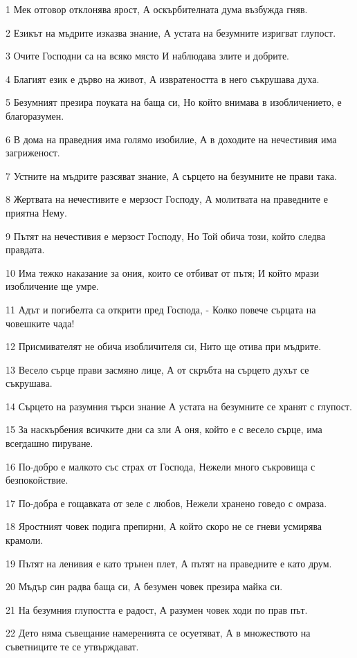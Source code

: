 \par 1 Мек отговор отклонява ярост, А оскърбителната дума възбужда гняв.
\par 2 Езикът на мъдрите изказва знание, А устата на безумните изригват глупост.
\par 3 Очите Господни са на всяко място И наблюдава злите и добрите.
\par 4 Благият език е дърво на живот, А извратеността в него съкрушава духа.
\par 5 Безумният презира поуката на баща си, Но който внимава в изобличението, е благоразумен.
\par 6 В дома на праведния има голямо изобилие, А в доходите на нечестивия има загриженост.
\par 7 Устните на мъдрите разсяват знание, А сърцето на безумните не прави така.
\par 8 Жертвата на нечестивите е мерзост Господу, А молитвата на праведните е приятна Нему.
\par 9 Пътят на нечестивия е мерзост Господу, Но Той обича този, който следва правдата.
\par 10 Има тежко наказание за ония, които се отбиват от пътя; И който мрази изобличение ще умре.
\par 11 Адът и погибелта са открити пред Господа, - Колко повече сърцата на човешките чада!
\par 12 Присмивателят не обича изобличителя си, Нито ще отива при мъдрите.
\par 13 Весело сърце прави засмяно лице, А от скръбта на сърцето духът се съкрушава.
\par 14 Сърцето на разумния търси знание А устата на безумните се хранят с глупост.
\par 15 За наскърбения всичките дни са зли А оня, който е с весело сърце, има всегдашно пируване.
\par 16 По-добро е малкото със страх от Господа, Нежели много съкровища с безпокойствие.
\par 17 По-добра е гощавката от зеле с любов, Нежели хранено говедо с омраза.
\par 18 Яростният човек подига препирни, А който скоро не се гневи усмирява крамоли.
\par 19 Пътят на ленивия е като трънен плет, А пътят на праведните е като друм.
\par 20 Мъдър син радва баща си, А безумен човек презира майка си.
\par 21 На безумния глупостта е радост, А разумен човек ходи по прав път.
\par 22 Дето няма съвещание намеренията се осуетяват, А в множеството на съветниците те се утвърждават.
